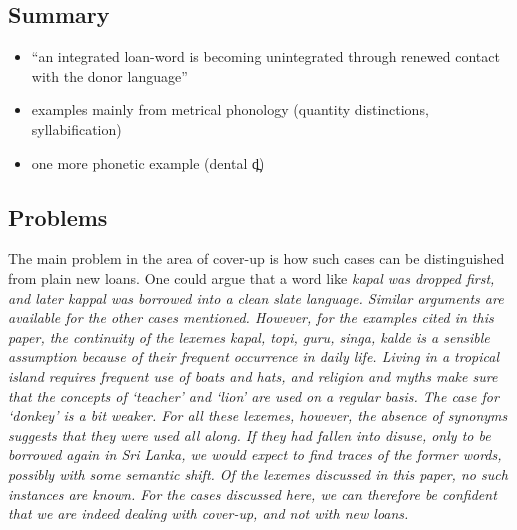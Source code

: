\documentclass[a4paper,10pt]{article}
\newcommand{\dentd}{d̪}
\begin{document}
\subsection{Summary} 
\begin{itemize}
 \item ``an integrated loan-word is becoming unintegrated through renewed contact with the donor language''
 \item examples mainly from metrical phonology (quantity distinctions, syllabification)
 \item one more phonetic example (dental {\dentd})
\end{itemize} 

\subsection{Problems} 
The main problem in the area of cover-up is how such cases can be distinguished from plain new loans. One could argue that a word like \em kapal \em was dropped first, and later \em kappal \em was borrowed into a clean slate language. Similar arguments are available for the other cases mentioned. However, for the examples cited in this paper, the continuity of the lexemes \em kapal, topi, guru, singa, kalde \em is a sensible assumption because of their frequent occurrence in daily life. Living in a tropical island requires frequent use of boats and hats, and religion and myths make sure that the concepts of `teacher' and `lion' are used on a regular basis. The case for `donkey' is a bit weaker. For all these lexemes, however, the absence of synonyms suggests that they were used all along. If they had fallen into disuse, only to be borrowed again in Sri Lanka, we would expect to find traces of the former words, possibly with some semantic shift. Of the lexemes discussed in this paper, no such instances are known. For the cases discussed here, we can therefore be confident that we are indeed dealing with cover-up, and not with new loans. 
\end{document}
